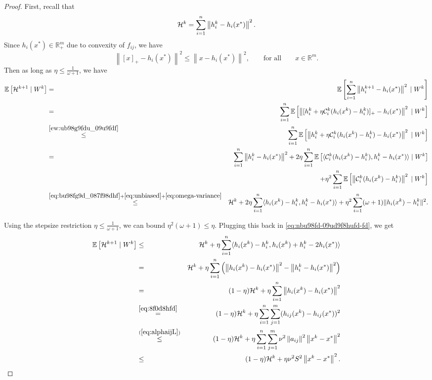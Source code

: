 \documentclass[12pt]{article}
\newcommand{\R}{\mathbb{R}}
\newcommand{\ExpBr}[1]{\mathbb{E}\left[#1\right]}
\newcommand{\norm}[1]{\left\|#1\right\|}
\newcommand{\cC}{{\mathcal{C}}}
\begin{document}
\begin{proof}
First, recall that
\begin{equation}\label{eq:bu98fg9d_087f98dhf}{\cal H}^{k} =   \sum_{i=1}^n \norm{h_i^{k} - h_i(x^*)}^2 .\end{equation}Since $h_{i}(x^*) \in \R^m_+$ due to convexity of $f_{ij}$, we have \begin{equation} \label{ew:ub98g9fdu_09u9fdf}\norm{[x]_+ - h_i(x^*)}^2 \leq \norm{x - h_i(x^*)}^2, \qquad \text{for all} \qquad x \in \R^m.\end{equation} Then as long as $\eta \leq \frac{1}{\omega+1}$, we have 
\begin{eqnarray}
\ExpBr{{\cal H}^{k+1} \;|\; W^k}	&=& \ExpBr{  \sum_{i=1}^n \norm{h_i^{k+1} - h_i(x^*)}^2  \;|\; W^k} \notag \\ 
	&=&  \sum_{i=1}^n\ExpBr{  \norm{ [h^k_i + \eta \cC_i^k(h_i(x^k) - h^k_i)]_+ - h_i(x^*) }^2  \;|\; W^k} \notag  \\ 
	&\overset{\eqref{ew:ub98g9fdu_09u9fdf}}{\leq} &    \sum_{i=1}^n \ExpBr{\norm{ h^k_i + \eta \cC_i^k(h_i(x^k) - h^k_i) - h_i(x^*) }^2 \;|\; W^k }\notag  \\ 
	&=& \sum_{i=1}^n  \norm{ h_i^k - h_i(x^*) }^2   + 2 \eta\sum_{i=1}^n \ExpBr{  \langle  \cC_i^k(h_i(x^k) - h_i^k),  h_i^k - h_i(x^*) \rangle \;|\; W^k}\notag  \\
	&& \qquad + \eta^2 \sum_{i=1}^n \ExpBr{ \norm{\cC_i^k(h_i(x^k) - h_i^k) }^2 \;|\; W^k} \notag \\ 
	&\overset{\eqref{eq:bu98fg9d_087f98dhf}+\eqref{eq:unbiased} + \eqref{eq:omega-variance}}{\leq} &  {\cal H}^k  + 2\eta \sum_{i=1}^n    \langle  h_i(x^k) - h_i^k, h_i^k - h_i(x^*) \rangle  + \eta^2 \sum_{i=1}^n  (\omega+1) \|h_i(x^k) - h_i^k\|^2 .\label{eq:nbu98fd-09ud9f8hufd-fd}
	\end{eqnarray}
	
Using the stepsize restriction $\eta \leq \frac{1}{\omega+1}$, we can bound $\eta^2 (\omega+1) \leq \eta$. Plugging this back in  \eqref{eq:nbu98fd-09ud9f8hufd-fd}, we get
\begin{eqnarray*}
\ExpBr{{\cal H}^{k+1} \;|\; W^k}
	&\leq &  {\cal H}^k  + \eta  \sum_{i=1}^n   \langle h_i(x^k) - h_i^k, h_i(x^k) + h_i^k - 2h_i(x^*) \rangle  \\ 
	&=&  {\cal H}^k  + \eta \sum_{i=1}^n  \left( \norm{h_i(x^k) - h_i(x^*)}^2 - \norm{h_i^k - h_i(x^*)}^2\right)   \\ 
	&=& (1-\eta) {\cal H}^k  + \eta \sum_{i=1}^n  \norm{h_i(x^k) - h_i(x^*)}^2  \\ 
		&\overset{\eqref{eq:8f0d8hfd}}{=} & (1-\eta) {\cal H}^k  + \eta \sum_{i=1}^n  \sum_{j=1}^m (h_{ij}(x^k) - h_{ij}(x^*))^2  \\ 
	&\overset{(\ref{eq:alphaijL})}{\leq}&  (1-\eta) {\cal H}^k + \eta\sum_{i=1}^n \sum_{j=1}^m \nu^2 \norm{a_{ij}}^2 \norm{x^k - x^*}^2 \\ 
	&\leq&  (1-\eta) {\cal H}^k +  \eta \nu^2 S^2 \norm{x^k - x^*}^2. 
\end{eqnarray*}

\end{proof}
\end{document}
